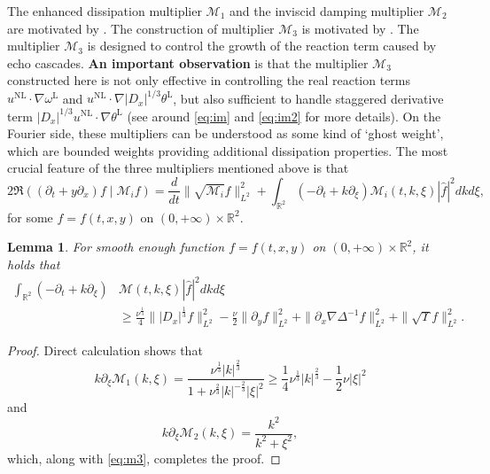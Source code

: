 \documentclass[reqno, 12pt]{amsart} %
\theoremstyle{plain} %
\newtheorem{Lem}[Thm]{Lemma}     %
\theoremstyle{definition}
\theoremstyle{remark}
\numberwithin{equation}{section} %
\newcommand{\no}{\nonumber}
\begin{document}
	The enhanced dissipation multiplier $\mathcal{M}_1$ and the inviscid damping multiplier $\mathcal{M}_2$ are  motivated by \cite{DWZ2021}. The construction of multiplier $\mathcal{M}_3$ is motivated by \cite{WZ2023}. The multiplier $\mathcal{M}_3$ is designed to control the growth of the reaction term caused by echo cascades. 
	\textbf{An important observation} is that the multiplier $\mathcal{M}_3$ constructed here is not only effective in controlling the real reaction terms $u^{\mathrm{NL}} \cdot \nabla \omega^{\mathrm{L}}$ and $u^{\mathrm{NL}} \cdot \nabla |D_x|^{1/3} \theta^{\mathrm{L}}$, but also sufficient to handle staggered derivative term $|D_x|^{1/3} u^{\mathrm{NL}} \cdot \nabla \theta^{\mathrm{L}}$ (see around \eqref{eq:im} and \eqref{eq:im2} for more details).
	On the Fourier side, these multipliers can be understood as some kind of `ghost weight', which are bounded weights providing additional dissipation properties. The most crucial feature of the three multipliers mentioned above is that
	$$
	2 \Re\left(\left(\partial_t+y \partial_x\right) f \mid \mathcal{M}_i f\right)=\frac{d}{d t}\|\sqrt{\mathcal{M}_i} f\|_{L^2}^2+\int_{\mathbb{R}^2}\left(-\partial_t+k \partial_{\xi}\right) \mathcal{M}_i(t, k, \xi)|\hat{f}|^2 d k d \xi,
	$$
	for some $f= f(t, x ,y)$ on $(0, +\infty) \times \mathbb{R}^2$.
	\begin{Lem} \label{lem:M12}
		For smooth enough function $f= f(t, x ,y)$ on $(0, +\infty) \times \mathbb{R}^2$, it holds that
		\begin{align}  \label{eq:m1m2}
			\int_{\mathbb{R}^2}\left(-\partial_t+k \partial_{\xi}\right) &\mathcal{M}(t, k, \xi)|\hat{f}|^2 d k d \xi \no \\
			& \geq \frac{\nu^{\frac{1}{3}}}{4}\|\left|D_x\right|^{\frac{1}{3}} f\|_{L^2}^2-\frac{\nu}{2}\|\partial_y f\|_{L^2}^2 + \|\partial_x \nabla \Delta^{-1} f\|_{L^2}^2 + \|\sqrt{\Upsilon} f\|_{L^2}^2.
		\end{align}
	\end{Lem}
	\begin{proof}
		Direct calculation shows that
		$$
		k \partial_{\xi} \mathcal{M}_1(k, \xi)=\frac{\nu^{\frac{1}{3}}|k|^{\frac{2}{3}}}{1+\nu^{\frac{2}{3}}|k|^{-\frac{2}{3}}|\xi|^2} \geq \frac{1}{4} \nu^{\frac{1}{3}}|k|^{\frac{2}{3}}-\frac{1}{2} \nu|\xi|^2
		$$
		and
		$$
		k \partial_{\xi} \mathcal{M}_2(k, \xi)=\frac{k^2}{k^2+\xi^2},
		$$
		which, along with \eqref{eq:m3}, completes the proof.
	\end{proof}
	
	
	
\end{document}
